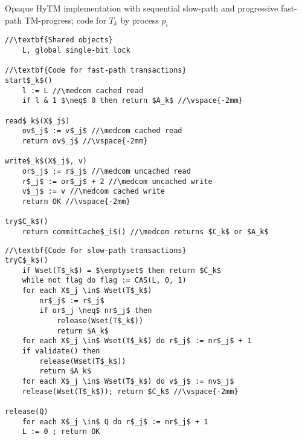 \begin{algorithm*}[!ht]
\caption{Opaque HyTM implementation with sequential slow-path and progressive fast-path TM-progress; code for $T_k$ by process $p_i$}
\label{alg:inswrite2}
\vspace{-1mm}
\noindent\lstset{style=customc}
\begin{minipage}{0.49\textwidth}
\begin{lstlisting}[frame=none,firstnumber=1,mathescape=true]
//\textbf{Shared objects}
    L, global single-bit lock

//\textbf{Code for fast-path transactions}
start$_k$()
    l := L //\medcom cached read
    if l & 1 $\neq$ 0 then return $A_k$ //\vspace{-2mm}

read$_k$(X$_j$)
    ov$_j$ := v$_j$ //\medcom cached read
    return ov$_j$ //\vspace{-2mm}

write$_k$(X$_j$, v)
    or$_j$ := r$_j$ //\medcom uncached read
    r$_j$ := or$_j$ + 2 //\medcom uncached write
    v$_j$ := v //\medcom cached write
    return OK //\vspace{-2mm}

try$C_k$()
    return commitCache$_i$() //\medcom returns $C_k$ or $A_k$
\end{lstlisting}
\end{minipage}
\begin{minipage}{0.49\textwidth}
\begin{lstlisting}[frame=none,firstnumber=last,mathescape=true]
//\textbf{Code for slow-path transactions}
tryC$_k$()
    if Wset(T$_k$) = $\emptyset$ then return $C_k$
    while not flag do flag := CAS(L, 0, 1)
    for each X$_j \in$ Wset(T$_k$)
        nr$_j$ := r$_j$
        if or$_j \neq$ nr$_j$ then
            release(Wset(T$_k$))
            return $A_k$
    for each X$_j \in$ Wset(T$_k$) do r$_j$ := nr$_j$ + 1
    if validate() then
        release(Wset(T$_k$))
        return $A_k$
    for each X$_j \in$ Wset(T$_k$) do v$_j$ := nv$_j$
    release(Wset(T$_k$)); return $C_k$ //\vspace{-2mm}
    
release(Q)
    for each X$_j \in$ Q do r$_j$ := nr$_j$ + 1
    L := 0 ; return OK
\end{lstlisting}
\end{minipage}
\vspace{-1mm}
\end{algorithm*}
